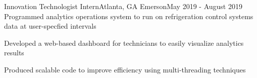 \resumeSubheading
{Innovation Technologist Intern}{Atlanta, GA}
{Emerson}{May 2019 - August 2019}
\resumeItemListStart
\resumeItem
{
    Programmed analytics operations system to run on refrigeration control systems data at
    user-specfied intervals
}

\resumeItem
{
    Developed a web-based dashboard for technicians to easily visualize analytics results
}

\resumeItem
{
    Produced scalable code to improve efficiency using multi-threading techniques
}

\resumeItemListEnd
